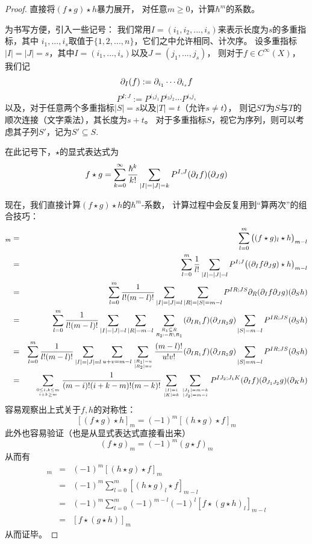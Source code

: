 \begin{proof}直接将$(f\star g)\star h$暴力展开，
对任意$m\geq 0$，计算$\hbar^m$的系数。

为书写方便，引入一些记号：
我们常用$I=(i_1,i_2,...,i_s)$来表示长度为$s$的多重指标，其中
$i_1,...,i_s$取值于$\{1,2,...,n\}$，它们之中允许相同、计次序。
设多重指标$|I|=|J|=s$，其中$I=(i_1,...,i_s)$以及$J=(j_1,...,j_s)$，
则对于$f\in C^{\infty}(X)$，我们记
$$\partial_I(f):=\partial_{i_1}\cdots\partial_{i_s}f$$
$$P^{I;J}:=P^{i_1j_1}P^{i_2j_2}\cdots P^{i_sj_s}$$
以及，对于任意两个多重指标$|S|=s$以及$|T|=t$（允许$s\neq t$），
则记$ST$为$S$与$T$的顺次连接（文字乘法），其长度为$s+t$。
对于多重指标$S$，视它为序列，则可以考虑其子列$S'$，记为$S'\subseteq S$.

在此记号下，$\star$的显式表达式为
$$f\star g=\sum_{k=0}^{\infty}\frac{\hbar^k}{k!}
\sum_{|I|=|J|=k}P^{I,J}(\partial_If)(\partial_Jg)$$

现在，我们直接计算$(f\star g)\star h$的$\hbar^m$-系数，
计算过程中会反复用到“算两次”的组合技巧：
\begin{eqnarray*}
     [(f\star g)\star h]_m
&=&
     \sum_{l=0}^m
       \big(
         (f\star g)_l\star h
       \big)_{m-l}\\
&=&
     \sum_{l=0}^m
       \frac{1}{l!}
       \sum_{|I|=|J|=l}
         P^{I;J}
         \big(
           (\p_If\p_Jg)\star h
         \big)_{m-l}\\
&=&
     \sum_{l=0}^m
       \frac{1}{l!(m-l)!}
       \sum_{|I|=|J|=l}
         \sum_{|R|=|S|=m-l}
           P^{IR;JS}
           \p_R(\p_If\p_Jg)(\p_Sh)\\
&=&
     \sum_{l=0}^m
       \frac{1}{l!(m-l)!}
       \sum_{|I|=|J|=l}
         \sum_{|R|=m-l}
           \sum_{R_1\subseteq R\atop R_2:=R\setminus R_1}
             (\p_{IR_1}f)(\p_{JR_2}g)
             \sum_{|S|=m-l}
               P^{IR;JS}(\p_Sh)\\
&=&
     \sum_{l=0}^m
       \frac{1}{l!(m-l)!}
       \sum_{|I|=|J|=l}
         \sum_{u+v=m-l}
           \sum_{|R_1|=u\atop|R_2|=v}
             \frac{(m-l)!}{u!v!}
             (\p_{IR_1}f)(\p_{JR_2}g)
             \sum_{|S|=m-l}
               P^{IR;JS}(\p_Sh)\\
&=&
     \sum_{0\leq i,k\leq m\atop i+k\geq m}
       \frac{1}{(m-i)!(i+k-m)!(m-k)!}
       \sum_{|I|=i\atop |K|=k}
         \sum_{|J_1|=m-k\atop |J_2|=m-i}
           P^{IJ_2;J_1K}
           (\p_If)(\p_{J_1J_2}g)(\p_Kh)
\end{eqnarray*}
容易观察出上式关于$f,h$的对称性：
$$[(f\star g)\star h]_m=(-1)^m[(h\star g)\star f]_m$$
此外也容易验证（也是从显式表达式直接看出来）
$$(f\star g)_m=(-1)^m(g\star f)_m$$
从而有
\begin{eqnarray*}
     [(f\star g)\star h]_m
&=&
     (-1)^m[(h\star g)\star f]_m\\
&=&
     (-1)^m
     \sum_{l=0}^m
       [(h\star g)_l\star f]_{m-l}\\
&=&
     (-1)^m
     \sum_{l=0}^m
       (-1)^{m-l}(-1)^l
       [f\star(g\star h)_l]_{m-l}\\
&=&
    [f\star (g\star h)]_m
\end{eqnarray*}
从而证毕。
\end{proof}

